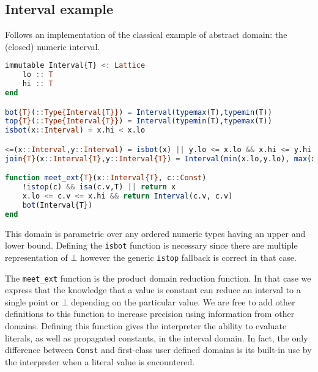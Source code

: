 \documentclass[11pt]{article}
\begin{document}
\subsection*{Interval example}
Follows an implementation of the classical example of abstract domain: the (closed) numeric interval.
\begin{singlespace}
\begin{lstlisting}[language=julia]
immutable Interval{T} <: Lattice
    lo :: T
    hi :: T
end

bot{T}(::Type{Interval{T}}) = Interval(typemax(T),typemin(T))
top{T}(::Type{Interval{T}}) = Interval(typemin(T),typemax(T))
isbot(x::Interval) = x.hi < x.lo

<=(x::Interval,y::Interval) = isbot(x) || y.lo <= x.lo && x.hi <= y.hi
join{T}(x::Interval{T},y::Interval{T}) = Interval(min(x.lo,y.lo), max(x.hi,y.hi))

function meet_ext{T}(x::Interval{T}, c::Const)
    !istop(c) && isa(c.v,T) || return x
    x.lo <= c.v <= x.hi && return Interval(c.v, c.v)
    bot(Interval{T})
end
\end{lstlisting}
\end{singlespace}

This domain is parametric over any ordered numeric types having an upper and lower bound. Defining the \verb~isbot~ function is necessary since there are multiple representation of $\bot$ however the generic \verb~istop~ fallback is correct in that case.

The \verb~meet_ext~ function is the product domain reduction function. In that case we express that the knowledge that a value is constant can reduce an interval to a single point or $\bot$ depending on the particular value. We are free to add other definitions to this function to increase precision using information from other domains. 
Defining this function gives the interpreter the ability to evaluate literals, as well as propagated constants, in the interval domain.  In fact, the only difference between \verb~Const~ and first-class user defined domains is its built-in use by the interpreter when a literal value is encountered. 
\end{document}
